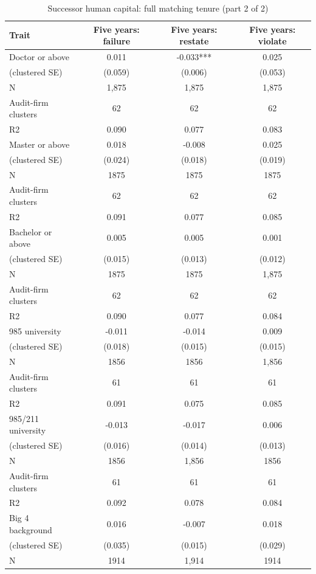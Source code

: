 \begin{table}[htbp]
\footnotesize
\centering
\caption{Successor human capital: full matching tenure (part 2 of 2)}
\begin{threeparttable}
\begin{tabular}{p{}ccc}
\toprule
Trait & Five years: failure & Five years: restate & Five years: violate \\
\midrule
Doctor or above & 0.011 & -0.033*** & 0.025 \\
(clustered SE) & (0.059) & (0.006) & (0.053) \\
N & 1,875 & 1,875 & 1,875 \\
Audit-firm clusters & 62 & 62 & 62 \\
R2 & 0.090 & 0.077 & 0.083 \\
Master or above & 0.018 & -0.008 & 0.025 \\
(clustered SE) & (0.024) & (0.018) & (0.019) \\
N & 1875 & 1875 & 1875 \\
Audit-firm clusters & 62 & 62 & 62 \\
R2 & 0.091 & 0.077 & 0.085 \\
Bachelor or above & 0.005 & 0.005 & 0.001 \\
(clustered SE) & (0.015) & (0.013) & (0.012) \\
N & 1875 & 1875 & 1,875 \\
Audit-firm clusters & 62 & 62 & 62 \\
R2 & 0.090 & 0.077 & 0.084 \\
985 university & -0.011 & -0.014 & 0.009 \\
(clustered SE) & (0.018) & (0.015) & (0.015) \\
N & 1856 & 1856 & 1,856 \\
Audit-firm clusters & 61 & 61 & 61 \\
R2 & 0.091 & 0.075 & 0.085 \\
985/211 university & -0.013 & -0.017 & 0.006 \\
(clustered SE) & (0.016) & (0.014) & (0.013) \\
N & 1856 & 1,856 & 1856 \\
Audit-firm clusters & 61 & 61 & 61 \\
R2 & 0.092 & 0.078 & 0.084 \\
Big 4 background & 0.016 & -0.007 & 0.018 \\
(clustered SE) & (0.035) & (0.015) & (0.029) \\
N & 1914 & 1,914 & 1914 \\

\end{tabular}
\end{threeparttable}
\end{table}
